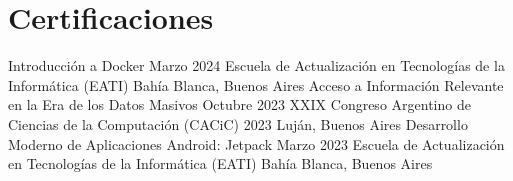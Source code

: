 \section{Certificaciones}
\resumeSubHeadingListStart
        \resumeSubheading
        {Introducción a Docker}
        {Marzo 2024}
        {Escuela de Actualización en Tecnologías de la Informática (EATI)}
        {Bahía Blanca, Buenos Aires}
        \resumeSubheading
        {Acceso a Información Relevante en la Era de los Datos Masivos}
        {Octubre 2023}
        {XXIX Congreso Argentino de Ciencias de la Computación (CACiC) 2023}
        {Luján, Buenos Aires}
        \resumeSubheading
        {Desarrollo Moderno de Aplicaciones Android: Jetpack}
        {Marzo 2023}
        {Escuela de Actualización en Tecnologías de la Informática (EATI)}
        {Bahía Blanca, Buenos Aires}
  \resumeSubHeadingListEnd
